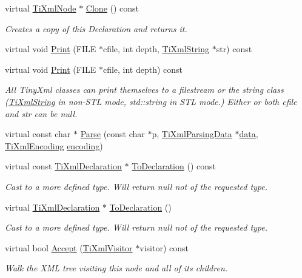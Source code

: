 \begin{DoxyCompactItemize}
virtual \hyperlink{class_ti_xml_node}{TiXmlNode} $\ast$ \hyperlink{class_ti_xml_declaration_aff8231266d735943d8a7514a9c9822b9}{Clone} () const 
\begin{DoxyCompactList}\small\item\em Creates a copy of this Declaration and returns it. \end{DoxyCompactList}\item 
virtual void \hyperlink{class_ti_xml_declaration_ae24e7e08dfc5c414965add510fecf270}{Print} (FILE $\ast$cfile, int depth, \hyperlink{class_ti_xml_string}{TiXmlString} $\ast$str) const 
\item 
virtual void \hyperlink{class_ti_xml_declaration_abf6303db4bd05b5be554036817ff1cb4}{Print} (FILE $\ast$cfile, int depth) const 
\begin{DoxyCompactList}\small\item\em All TinyXml classes can print themselves to a filestream or the string class (\hyperlink{class_ti_xml_string}{TiXmlString} in non-\/STL mode, std::string in STL mode.) Either or both cfile and str can be null. \end{DoxyCompactList}\item 
virtual const char $\ast$ \hyperlink{class_ti_xml_declaration_a9839ea97ed687a2b7342fd7b0f04361b}{Parse} (const char $\ast$p, \hyperlink{class_ti_xml_parsing_data}{TiXmlParsingData} $\ast$\hyperlink{bootstrap_8cc_a923b2158227405b9f7a6eceb6c7104c8}{data}, \hyperlink{tinyxml_8h_a88d51847a13ee0f4b4d320d03d2c4d96}{TiXmlEncoding} \hyperlink{class_ti_xml_declaration_a5eb346397dd758b4e9626fb68274d9d2}{encoding})
\item 
virtual const \hyperlink{class_ti_xml_declaration}{TiXmlDeclaration} $\ast$ \hyperlink{class_ti_xml_declaration_a1e085d3fefd1dbf5ccdbff729931a967}{ToDeclaration} () const 
\begin{DoxyCompactList}\small\item\em Cast to a more defined type. Will return null not of the requested type. \end{DoxyCompactList}\item 
virtual \hyperlink{class_ti_xml_declaration}{TiXmlDeclaration} $\ast$ \hyperlink{class_ti_xml_declaration_a6bd3d1daddcaeb9543c24bfd090969ce}{ToDeclaration} ()
\begin{DoxyCompactList}\small\item\em Cast to a more defined type. Will return null not of the requested type. \end{DoxyCompactList}\item 
virtual bool \hyperlink{class_ti_xml_declaration_ab6a6b178161ba9abc2c35058de689864}{Accept} (\hyperlink{class_ti_xml_visitor}{TiXmlVisitor} $\ast$visitor) const 
\begin{DoxyCompactList}\small\item\em Walk the XML tree visiting this node and all of its children. \end{DoxyCompactList}\end{DoxyCompactItemize}
